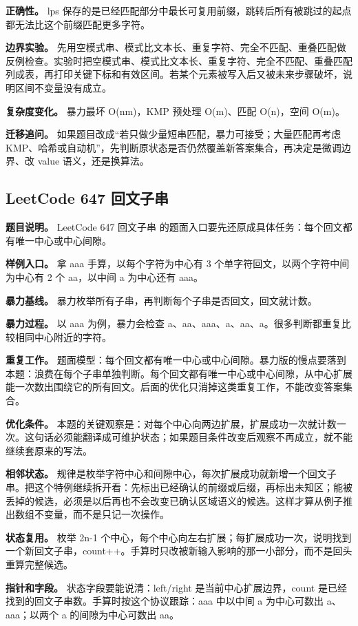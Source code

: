 \textbf{正确性。} lps 保存的是已经匹配部分中最长可复用前缀，跳转后所有被跳过的起点都无法比这个前缀匹配更多字符。

\textbf{边界实验。} 先用空模式串、模式比文本长、重复字符、完全不匹配、重叠匹配做反例检查。实验时把空模式串、模式比文本长、重复字符、完全不匹配、重叠匹配列成表，再打印关键下标和有效区间。若某个元素被写入后又被未来步骤破坏，说明区间不变量没有成立。

\textbf{复杂度变化。} 暴力最坏 O(nm)，KMP 预处理 O(m)、匹配 O(n)，空间 O(m)。

\textbf{迁移追问。} 如果题目改成“若只做少量短串匹配，暴力可接受；大量匹配再考虑 KMP、哈希或自动机”，先判断原状态是否仍然覆盖新答案集合，再决定是微调边界、改 value 语义，还是换算法。

\subsection{LeetCode 647 回文子串}

\textbf{题目说明。} LeetCode 647 回文子串 的题面入口要先还原成具体任务：每个回文都有唯一中心或中心间隙。

\textbf{样例入口。} 拿 aaa 手算，以每个字符为中心有 3 个单字符回文，以两个字符中间为中心有 2 个 aa，以中间 a 为中心还有 aaa。

\textbf{暴力基线。} 暴力枚举所有子串，再判断每个子串是否回文，回文就计数。

\textbf{暴力过程。} 以 aaa 为例，暴力会检查 a、aa、aaa、a、aa、a。很多判断都重复比较相同中心附近的字符。

\textbf{重复工作。} 题面模型：每个回文都有唯一中心或中心间隙。暴力版的慢点要落到本题：浪费在每个子串单独判断。每个回文都有唯一中心或中心间隙，从中心扩展能一次数出围绕它的所有回文。后面的优化只消掉这类重复工作，不能改变答案集合。

\textbf{优化条件。} 本题的关键观察是：对每个中心向两边扩展，扩展成功一次就计数一次。这句话必须能翻译成可维护状态；如果题目条件改变后观察不再成立，就不能继续套原来的写法。

\textbf{相邻状态。} 规律是枚举字符中心和间隙中心，每次扩展成功就新增一个回文子串。把这个特例继续拆开看：先标出已经确认的前缀或后缀，再标出未知区；能被丢掉的候选，必须是以后再也不会改变已确认区域语义的候选。这样才算从例子推出数组不变量，而不是只记一次操作。

\textbf{状态复用。} 枚举 2n-1 个中心，每个中心向左右扩展；每扩展成功一次，说明找到一个新回文子串，count++。手算时只改被新输入影响的那一小部分，而不是回头重算完整候选。

\textbf{指针和字段。} 状态字段要能说清：left/right 是当前中心扩展边界，count 是已经找到的回文子串数。手算时按这个协议跟踪：aaa 中以中间 a 为中心可数出 a、aaa；以两个 a 的间隙为中心可数出 aa。

